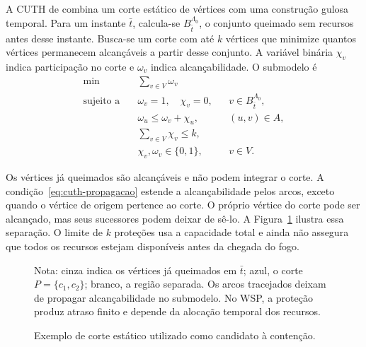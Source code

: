 A CUTH de  combina um corte estático de vértices
com uma construção gulosa temporal. Para um instante $\bar t$, calcula-se
$B_{\bar t}^{\Lambda_0}$, o conjunto queimado sem recursos antes desse
instante. Busca-se um corte com até $k$ vértices que minimize quantos
vértices permanecem alcançáveis a partir desse conjunto. A variável
binária $\chi_v$ indica participação no corte e $\omega_v$ indica
alcançabilidade. O submodelo é
\begin{align}
 \min\quad &\sum_{v\in V}\omega_v \label{eq:cuth-objetivo}\\
 \text{sujeito a}\quad &\omega_v=1,\quad\chi_v=0,
       &&v\in B_{\bar t}^{\Lambda_0}, \label{eq:cuth-fontes}\\
 &\omega_u\leq\omega_v+\chi_u,
       &&(u,v)\in A, \label{eq:cuth-propagacao}\\
 &\sum_{v\in V}\chi_v\leq k, \label{eq:cuth-capacidade}\\
 &\chi_v,\omega_v\in\{0,1\},&&v\in V.
\end{align}

Os vértices já queimados são alcançáveis e não podem integrar o corte.
A condição~\eqref{eq:cuth-propagacao} estende a alcançabilidade pelos arcos,
exceto quando o vértice de origem pertence ao corte. O próprio vértice do
corte pode ser alcançado, mas seus sucessores podem deixar de sê-lo.
A Figura~\ref{fig:corte-estatico} ilustra essa separação. O limite de
$k$ proteções usa a capacidade total e ainda não assegura que todos os
recursos estejam disponíveis antes da chegada do fogo.

\begin{figure}[htbp]
\centering
\caption{Exemplo de corte estático utilizado como candidato à contenção.}
\label{fig:corte-estatico}
\begin{singlespace}
\par\smallskip
{\small Nota: cinza indica os vértices já queimados em $\bar t$; azul, o corte
$P=\{c_1,c_2\}$; branco, a região separada. Os arcos tracejados deixam de
propagar alcançabilidade no submodelo. No WSP, a proteção produz atraso
finito e depende da alocação temporal dos recursos.\par}
{}
\end{singlespace}
\end{figure}

